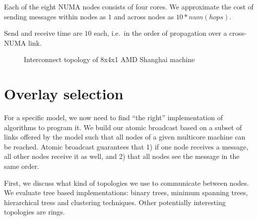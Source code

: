 \documentclass{article}
\begin{document}
Each of the eight NUMA nodes consists of four cores. We approximate the
cost of sending messages within nodes as $1$ and across nodes as
$10*num(hops)$.

Send and receive time are $10$ each, i.e.\ in the order of propagation
over a cross-NUMA link.

\begin{figure}[htb]
  \centering
  \caption{Interconnect topology of 8x4x1 AMD Shanghai machine}
  \label{fig:gruyere}
\end{figure}

\section{Overlay selection}
\label{sec:overlay}

For a specific model, we now need to find ``the right'' implementation
of algorithms to program it. We build our atomic broadcast based on a
subset of links offered by the model such that all nodes of a given
multicore machine can be reached. Atomic broadcast guarantees that 1)
if one node receives a message, all other nodes receive it as well,
and 2) that all nodes see the message in the same order.

First, we discuss what kind of topologies we use to communicate
between nodes. We evaluate tree based implementations: binary trees,
minimum spanning trees, hierarchical tress and clustering
techniques. Other potentially interesting topologies are rings.
\end{document}
